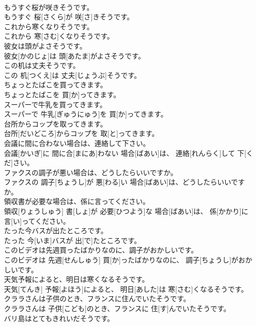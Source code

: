 \documentclass[8pt]{extreport}
\begin{document}
\begin{CJK}{UTF8}{min}
\\	もうすぐ桜が咲きそうです。	
\\	もうすぐ 桜[さくら]が 咲[さ]きそうです。	
\\	これから寒くなりそうです。	
\\	これから 寒[さむ]くなりそうです。	
\\	彼女は頭がよさそうです。	
\\	彼女[かのじょ]は 頭[あたま]がよさそうです。	
\\	この机は丈夫そうです。	
\\	この 机[つくえ]は 丈夫[じょうぶ]そうです。	
\\	ちょっとたばこを買ってきます。	
\\	ちょっとたばこを 買[か]ってきます。	
\\	スーパーで牛乳を買ってきます。	
\\	スーパーで 牛乳[ぎゅうにゅう]を 買[か]ってきます。	
\\	台所からコップを取ってきます。	
\\	台所[だいどころ]からコップを 取[と]ってきます。	
\\	会議に間に合わない場合は、連絡して下さい。	
\\	会議[かいぎ]に 間に合[まにあ]わない 場合[ばあい]は、 連絡[れんらく]して 下[くだ]さい。	
\\	ファクスの調子が悪い場合は、どうしたらいいですか。	
\\	ファクスの 調子[ちょうし]が 悪[わる]い 場合[ばあい]は、どうしたらいいですか。	
\\	領収書が必要な場合は、係に言ってください。	
\\	領収[りょうしゅう] 書[しょ]が 必要[ひつよう]な 場合[ばあい]は、 係[かかり]に 言[い]ってください。	
\\	たった今バスが出たところです。	
\\	たった 今[いま]バスが 出[で]たところです。	
\\	このビデオは先週買ったばかりなのに、調子がおかしいです。	
\\	このビデオは 先週[せんしゅう] 買[か]ったばかりなのに、 調子[ちょうし]がおかしいです。	
\\	天気予報によると、明日は寒くなるそうです。	
\\	天気[てんき] 予報[よほう]によると、 明日[あした]は 寒[さむ]くなるそうです。	
\\	クララさんは子供のとき、フランスに住んでいたそうです。	
\\	クララさんは 子供[こども]のとき、フランスに 住[す]んでいたそうです。	
\\	バリ島はとてもきれいだそうです。	

\end{CJK}
\end{document}
